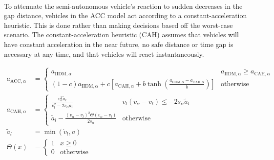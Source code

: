 \documentclass[12pt]{article}
\begin{document}
\paragraph{}
To attenuate the semi-autonomous vehicle's reaction to sudden decreases in the gap distance, vehicles in the ACC model act according to a constant-acceleration heuristic. This is done rather than making decisions based off the worst-case scenario.  The constant-acceleration heuristic (CAH) assumes that vehicles will have constant acceleration in the near future, no safe distance or time gap is necessary at any time, and that vehicles will react instantaneously.\cite[chapter~11]{treiber_kesting_2013}
\begin{mymathbox}[ams gather, title=ACC Governing Functions, colframe=blue!30!black]
  \begin{align}
  a_{\text{ACC},\alpha}&= 
  \begin{cases}
  a_{\text{IIDM},\alpha} & a_{\text{IIDM},\alpha} \ge a_{\text{CAH},\alpha}\\
  (1-c)a_{\text{IIDM},\alpha} + c\left[a_{\text{CAH},\alpha} + b \tanh(\frac{a_{\text{IIDM},\alpha}-a_{\text{CAH},\alpha}}{b}) \right] & \text{otherwise}
  \end{cases}\\
  a_{\text{CAH},\alpha}&= 
  \begin{cases}
  \frac{v_\alpha^2\tilde{a}_l}{v_l^2 - 2 s_\alpha\tilde{a}_l} & v_l(v_\alpha-v_l) \le -2s_\alpha\tilde{a}_l\\
  \tilde{a}_l - \frac{(v_\alpha-v_l)^2 \Theta (v_\alpha-v_l)}{2s_\alpha} & \text{otherwise}
  \end{cases}\\
  \tilde{a}_l &= \min(\dot{v}_l, a)\\
   \Theta (x)&= 
   \begin{cases}
   1 & x\geq 0\\
   0 & \text{otherwise}
   \end{cases}
   \end{align}
\end{mymathbox}
\end{document}
